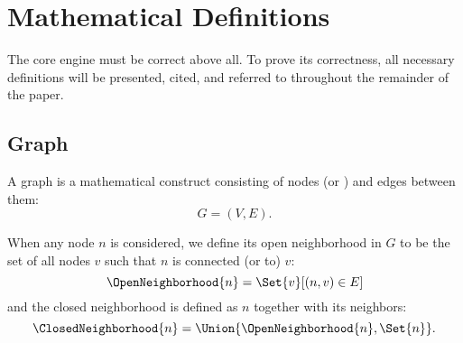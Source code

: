 \section{Mathematical Definitions}
\label{sec:math-defin}

The core engine must be correct above all.
To prove its correctness, all necessary definitions will be
  presented, cited, and referred to throughout the remainder of the paper.

\subsection{Graph}
\label{sec:math-defin:graphs}

A graph is a mathematical construct
  consisting of nodes (or ) and edges between them:
  \begin{equation}
    \label{eq:define-graph}
    G = (V, E).
  \end{equation}

When any node $n$ is considered, we define its open neighborhood in $G$ to be
  the set of all nodes $v$ such that $n$ is connected (or  to) $v$:
  \begin{equation}
    \label{eq:define-open-neighborhood}
    \OpenNeighborhood{n} = \Set{v}[(n, v) \in E]
  \end{equation}
  and the closed neighborhood is defined as $n$ together with its neighbors:
  \begin{equation}
    \label{eq:define-closed-neighborhood}
    \ClosedNeighborhood{n} = \Union{\OpenNeighborhood{n}, \Set{n}}.
  \end{equation}

\begin{comment}
\subsection{Finite State Machine}
\label{sec:math-define:fsm}

A finite state machine (\textsc{fsm})
  \todo{use acro package}
  \todo{may not even \emph{need} this section}
  is a mathematical model of computation
  described by an alphabet $\Sigma$,
  a finite number of states $Q$,
  an initial state $q_0 \in Q$,
  a set of accept states $F \subseteq Q$,
  and a transition function $\Function[\delta]{Q \cross \Sigma}{Q}$ between those states.
Thus, a fsm is defined by the five-tuple %
  \[ M = (\Sigma, Q, q_0, F, \delta). \]
These can be represented as graphs where nodes are states in $Q$ and
  transitions are directed edges between them.
\todo[cite]{finite state machine}
\end{comment}

